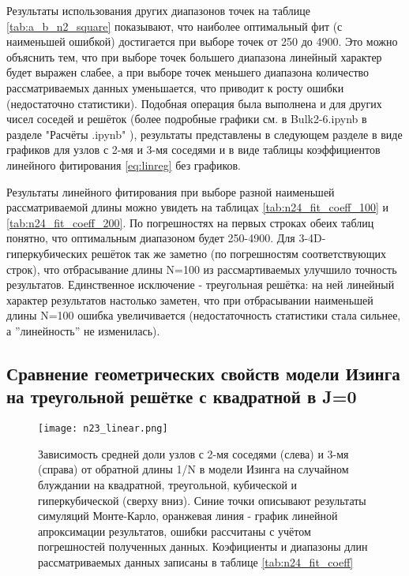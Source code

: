 Результаты использования других диапазонов точек на таблице \ref{tab:a_b_n2_square} показывают, что наиболее оптимальный фит (с наименьшей ошибкой) достигается при выборе точек от 250 до 4900. Это можно объяснить тем, что при выборе точек большего диапазона линейный характер будет выражен слабее, а при выборе точек меньшего диапазона количество рассматриваемых данных уменьшается, что приводит к росту ошибки (недостаточно статистики). Подобная операция была выполнена и для других чисел соседей и решёток (более подробные графики см. в Bulk2-6.ipynb в разделе "Расчёты .ipynb" \cite{web:ProjectMagnetRepos}), результаты представлены в следующем разделе в виде графиков для узлов с 2-мя и 3-мя соседями и в виде таблицы коэффициентов линейного фитирования \eqref{eq:linreg} без графиков. 

Результаты линейного фитирования при выборе разной наименьшей рассматриваемой длины можно увидеть на таблицах \ref{tab:n24_fit_coeff_100} и \ref{tab:n24_fit_coeff_200}. По погрешностях на первых строках обеих таблиц понятно, что оптимальным диапазоном будет 250-4900. Для 3-4D-гиперкубических решёток так же заметно (по погрешностям соответствующих строк), что отбрасывание длины N=100 из рассмартиваемых улучшило точность результатов. Единственное исключение - треугольная решётка: на ней линейный характер результатов настолько заметен, что при отбрасывании наименьшей длины N=100 ошибка увеличивается (недостаточность статистики стала сильнее, а ''линейность'' не изменилась).

\newpage

\subsection{Сравнение геометрических свойств модели Изинга на треугольной решётке с квадратной в J=0}

\begin{figure}
    \centering
    \texttt{[image: n23\_linear.png]}
    \caption{Зависимость средней доли узлов с 2-мя соседями (слева) и 3-мя (справа) от обратной длины 1/N в модели Изинга на случайном блуждании на квадратной, треугольной, кубической и гиперкубической (сверху вниз). Синие точки описывают результаты симуляций Монте-Карло, оранжевая линия - график линейной апроксимации результатов, ошибки рассчитаны с учётом погрешностей полученных данных. Коэфициенты и диапазоны длин рассматриваемых данных записаны в таблице \ref{tab:n24_fit_coeff}}
    \label{fig:all_n23_bulk}
\end{figure}

